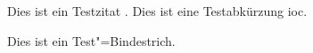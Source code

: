 
\section{\sectionname}
Dies ist ein Testzitat \parencite{amazonAmazonComputeSLA2022}.
Dies ist eine Testabkürzung \gls{ioc}.

Dies ist ein Test"=Bindestrich.